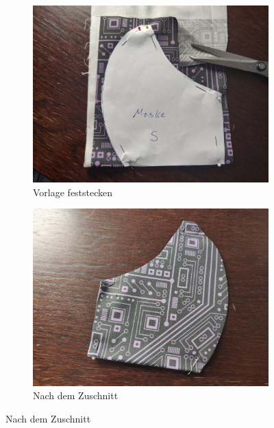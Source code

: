 \documentclass[12pt,parskip=full]{scrartcl}
\begin{document}
\begin{figure}[ht]
    \vspace{0.5cm}
    \centering
    \begin{subfigure}{0.48\textwidth}
        \centering
        \includegraphics[width = \linewidth]{Pictures/03_Cutting/Cutting_01_resized.jpg}
        \caption{Vorlage feststecken}
        \label{Cutting1}
    \end{subfigure}
    \begin{subfigure}{0.48\textwidth}
        \centering
        \includegraphics[width = \linewidth]{Pictures/03_Cutting/Cutting_02_resized.jpg}
        \caption{Nach dem Zuschnitt}
        \label{Cutting2}
    \end{subfigure}

\end{figure}
\end{document}
